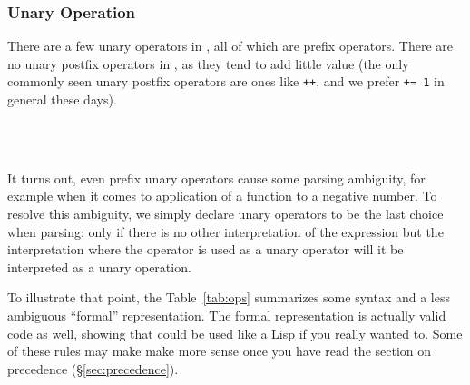 \subsubsection{Unary Operation}
\label{sec:unaryop}
\FloatBarrier

There are a few unary operators in \Poetry{}, all of which are prefix operators.
There are no unary postfix operators in \Trilogy{}, as they tend to add little
value (the only commonly seen unary postfix operators are ones like \texttt{++},
and we prefer \texttt{+= 1} in general these days).

\begin{bnf*}
     \\
     \\
\end{bnf*}

It turns out, even prefix unary operators cause some parsing ambiguity, for example
when it comes to application of a function to a negative number. To resolve this
ambiguity, we simply declare unary operators to be the last choice when parsing:
only if there is no other interpretation of the expression but the interpretation
where the operator is used as a unary operator will it be interpreted as a unary
operation.

To illustrate that point, the Table~\ref{tab:ops} summarizes some syntax and a
less ambiguous ``formal'' representation. The formal representation is actually
valid \Trilogy{} code as well, showing that \Trilogy{} could be used like a Lisp
if you really wanted to. Some of these rules may make make more sense once you
have read the section on precedence (\S\ref{sec:precedence}).

